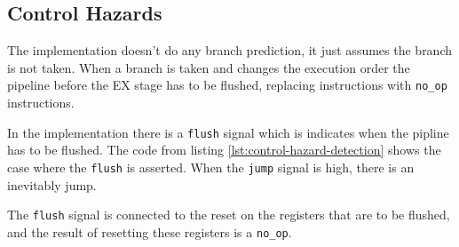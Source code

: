 \subsection{Control Hazards}
The implementation doesn't do any branch prediction, it just assumes the branch is not taken.
When a branch is taken and changes the execution order the pipeline before the EX stage has to be flushed,
replacing instructions with \texttt{no\_op} instructions.

In the implementation there is a \texttt{flush} signal which is indicates when the pipline has to be flushed.
The code from listing \ref{lst:control-hazard-detection} shows the case where the \texttt{flush} is asserted.
When the \texttt{jump} signal is high, there is an inevitably jump.


The \texttt{flush} signal is connected to the reset on the registers that are to be flushed,
and the result of resetting these registers is a \texttt{no\_op}.

